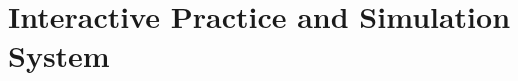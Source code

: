 \documentclass[
    12pt,
    a4paper,
    oneside,
    openany
]{book}
\begin{document}




\part{Interactive Practice and Simulation System}
\end{document}
